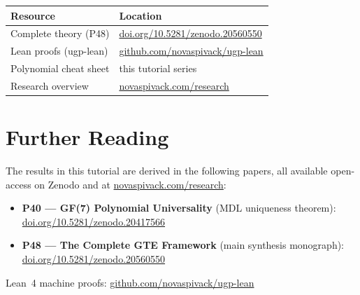 \documentclass[11pt,a4paper]{article}
\theoremstyle{definition}
\begin{document}
\bigskip
\begin{center}
\begin{tabular}{ll}
\toprule
\textbf{Resource} & \textbf{Location} \\
\midrule
Complete theory (P48) & \href{https://doi.org/10.5281/zenodo.20560550}{doi.org/10.5281/zenodo.20560550} \\
Lean proofs (ugp-lean) & \href{https://github.com/novaspivack/ugp-lean}{github.com/novaspivack/ugp-lean} \\
Polynomial cheat sheet & this tutorial series \\
Research overview & \href{https://novaspivack.com/research}{novaspivack.com/research} \\
\bottomrule
\end{tabular}
\end{center}


\section*{Further Reading}
\begin{tcolorbox}[colback=orange!8,colframe=orange!50!black,
  title=\textbf{Primary Sources}]
The results in this tutorial are derived in the following papers,
all available open-access on Zenodo and at
\href{https://novaspivack.com/research}{novaspivack.com/research}:
\begin{itemize}
  \item \textbf{P40 --- GF(7) Polynomial Universality} (MDL uniqueness theorem):\\
        \href{https://doi.org/10.5281/zenodo.20417566}{doi.org/10.5281/zenodo.20417566}
  \item \textbf{P48 --- The Complete GTE Framework} (main synthesis monograph):\\
        \href{https://doi.org/10.5281/zenodo.20560550}{doi.org/10.5281/zenodo.20560550}
\end{itemize}
Lean~4 machine proofs: \href{https://github.com/novaspivack/ugp-lean}{github.com/novaspivack/ugp-lean}
\end{tcolorbox}


\end{document}
